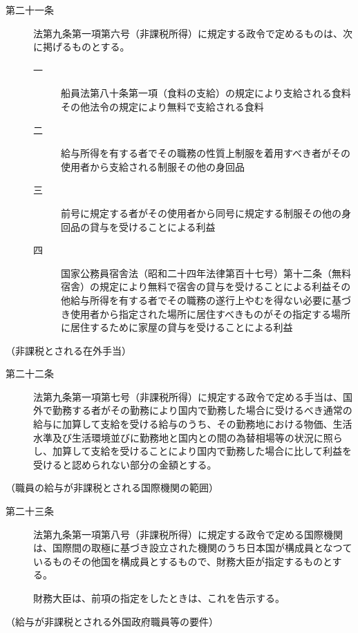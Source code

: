 \documentclass[twocolumn,a4j,10pt]{ltjtarticle}
\begin{document}
\begin{description}
\item[第二十一条]法第九条第一項第六号（非課税所得）に規定する政令で定めるものは、次に掲げるものとする。
\begin{description}
\item[一]船員法第八十条第一項（食料の支給）の規定により支給される食料その他法令の規定により無料で支給される食料
\item[二]給与所得を有する者でその職務の性質上制服を着用すべき者がその使用者から支給される制服その他の身回品
\item[三]前号に規定する者がその使用者から同号に規定する制服その他の身回品の貸与を受けることによる利益
\item[四]国家公務員宿舎法（昭和二十四年法律第百十七号）第十二条（無料宿舎）の規定により無料で宿舎の貸与を受けることによる利益その他給与所得を有する者でその職務の遂行上やむを得ない必要に基づき使用者から指定された場所に居住すべきものがその指定する場所に居住するために家屋の貸与を受けることによる利益
\end{description}
\end{description}
\noindent\hspace{10pt}（非課税とされる在外手当）
\begin{description}
\item[第二十二条]法第九条第一項第七号（非課税所得）に規定する政令で定める手当は、国外で勤務する者がその勤務により国内で勤務した場合に受けるべき通常の給与に加算して支給を受ける給与のうち、その勤務地における物価、生活水準及び生活環境並びに勤務地と国内との間の為替相場等の状況に照らし、加算して支給を受けることにより国内で勤務した場合に比して利益を受けると認められない部分の金額とする。
\end{description}
\noindent\hspace{10pt}（職員の給与が非課税とされる国際機関の範囲）
\begin{description}
\item[第二十三条]法第九条第一項第八号（非課税所得）に規定する政令で定める国際機関は、国際間の取極に基づき設立された機関のうち日本国が構成員となつているものその他国を構成員とするもので、財務大臣が指定するものとする。
\item[]財務大臣は、前項の指定をしたときは、これを告示する。
\end{description}
\noindent\hspace{10pt}（給与が非課税とされる外国政府職員等の要件）
\end{document}
